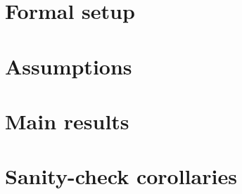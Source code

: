 \documentclass[11pt]{article}
\theoremstyle{definition}
\theoremstyle{plain}
\theoremstyle{remark}
\begin{document}
\section{Formal setup}

\section{Assumptions}

\section{Main results}

\section{Sanity-check corollaries}
\end{document}
